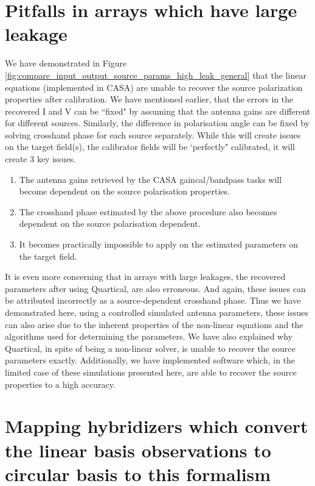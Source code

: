 \documentclass{article}
\begin{document}
\section{Pitfalls in arrays which have large leakage}

We have demonstrated in Figure \ref{fig:compare_input_output_source_params_high_leak_general} that the linear equations (implemented in CASA) are unable to recover the source polarization properties after calibration. We have mentioned earlier, that the errors in the recovered I and V can be ``fixed" by assuming that the antenna gains are different for different sources. Similarly, the difference in polarisation angle can be fixed by solving crosshand phase for each source separately. While this will create issues on the target field(s), the calibrator fields will be `perfectly" calibrated, it will create 3 key issues.
\begin{enumerate}
\item The antenna gains retrieved by the CASA gaincal/bandpass tasks will become dependent on the source polarisation properties.
\item The crosshand phase estimated by the above procedure also becomes dependent on the source polarisation dependent.
\item It becomes practically impossible to apply on the estimated parameters on the target field.
\end{enumerate}

It is even more concerning that in arrays with large leakages, the recovered parameters after using Quartical, are also erroneous. And again, these issues can be attributed incorrectly as a source-dependent crosshand phase. Thus we have demonstrated here, using a controlled simulated antenna parameters, these issues can also arise due to the inherent properties of the non-linear equations and the algorithms used for determining the parameters. We have also explained why Quartical, in spite of being a non-linear solver, is unable to recover the source parameters exactly. Additionally, we have implemented software which, in the limited case of these simulations presented here, are able to recover the source properties to a high accuracy.

\section{Mapping hybridizers which convert the linear basis observations to circular basis to this formalism}
\end{document}
